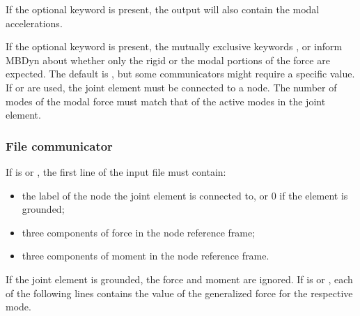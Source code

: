 If the optional keyword  is present,
the output will also contain the modal accelerations.

If the optional keyword  is present,
the mutually exclusive keywords ,  or 
inform MBDyn about whether only the rigid or the modal portions
of the force are expected.
The default is , but some communicators might require
a specific value.
If  or  are used, the  joint element
must be connected to a  node.
The number of modes of the modal force must match that of the active modes
in the  joint element.



\subsubsection{File communicator}
If  is  or , the first line of the input file
must contain:
\begin{itemize}
\item the label of the  node the  joint element
	is connected to, or 0 if the element is grounded;
\item three components of force in the  node reference frame;
\item three components of moment in the  node reference frame.
\end{itemize}
If the  joint element is grounded, the force and moment
are ignored.
If  is  or ,
each of the following lines contains the value of the generalized force
for the respective mode.

